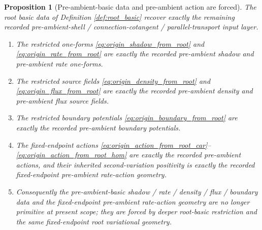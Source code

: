 \documentclass[11pt]{article}
\newtheorem{proposition}{Proposition}
\begin{document}
\begin{proposition}[Pre-ambient-basic data and pre-ambient action are forced]
\label{prop:origin_basic_forced}
The root basic data of Definition \ref{def:root_basic} recover exactly the remaining recorded pre-ambient-shell / connection-cotangent / parallel-transport input layer.
\begin{enumerate}
    \item The restricted one-forms \eqref{eq:origin_shadow_from_root} and \eqref{eq:origin_rate_from_root} are exactly the recorded pre-ambient shadow and pre-ambient rate one-forms.
    \item The restricted source fields \eqref{eq:origin_density_from_root} and \eqref{eq:origin_flux_from_root} are exactly the recorded pre-ambient density and pre-ambient flux source fields.
    \item The restricted boundary potentials \eqref{eq:origin_boundary_from_root} are exactly the recorded pre-ambient boundary potentials.
    \item The fixed-endpoint actions \eqref{eq:origin_action_from_root_car}--\eqref{eq:origin_action_from_root_hom} are exactly the recorded pre-ambient actions, and their inherited second-variation positivity is exactly the recorded fixed-endpoint pre-ambient rate-action geometry.
    \item Consequently the pre-ambient-basic shadow / rate / density / flux / boundary data and the fixed-endpoint pre-ambient rate-action geometry are no longer primitive at present scope; they are forced by deeper root-basic restriction and the same fixed-endpoint root variational geometry.
\end{enumerate}
\end{proposition}
\end{document}
